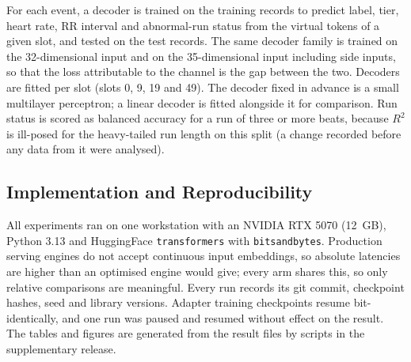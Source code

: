  For each event, a decoder is trained on the training records to predict label, tier, heart rate, RR interval and abnormal-run status from the virtual tokens of a given slot, and tested on the test records. The same decoder family is trained on the 32-dimensional input and on the 35-dimensional input including side inputs, so that the loss attributable to the channel is the gap between the two. Decoders are fitted per slot (slots 0, 9, 19 and 49). The decoder fixed in advance is a small multilayer perceptron; a linear decoder is fitted alongside it for comparison. Run status is scored as balanced accuracy for a run of three or more beats, because $R^2$ is ill-posed for the heavy-tailed run length on this split (a change recorded before any data from it were analysed).

\subsection{Implementation and Reproducibility}
All experiments ran on one workstation with an NVIDIA RTX 5070 (12~GB), Python 3.13 and HuggingFace \texttt{transformers} with \texttt{bitsandbytes}. Production serving engines do not accept continuous input embeddings, so absolute latencies are higher than an optimised engine would give; every arm shares this, so only relative comparisons are meaningful. Every run records its git commit, checkpoint hashes, seed and library versions. Adapter training checkpoints resume bit-identically, and one run was paused and resumed without effect on the result. The tables and figures are generated from the result files by scripts in the supplementary release.